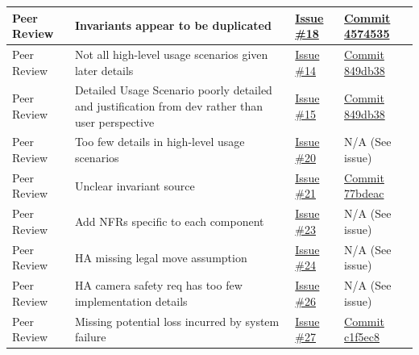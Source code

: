\documentclass{article}
\begin{document}
\begin{landscape}
\begin{tabularx}{\linewidth}{|P{2.3cm}|Y|P{2.5cm}|P{3.5cm}|}
        \hline
        Peer Review &
        Invariants appear to be duplicated &
        \href{https://github.com/AlgoCatan/RLCatan/issues/18}{Issue \#18} &
        \href{https://github.com/AlgoCatan/RLCatan/commit/4574535067f674fb58bea087aebc4723ab7042a7}{Commit 4574535} \\

        \hline
        Peer Review &
        Not all high-level usage scenarios given later details &
        \href{https://github.com/AlgoCatan/RLCatan/issues/14}{Issue \#14} &
        \href{https://github.com/AlgoCatan/RLCatan/commit/849db38b2cf12eb7b75cb533febe9b18bc03d4c8}{Commit 849db38} \\

        \hline
        Peer Review &
        Detailed Usage Scenario poorly detailed and justification from dev rather than user perspective &
        \href{https://github.com/AlgoCatan/RLCatan/issues/15}{Issue \#15} &
        \href{https://github.com/AlgoCatan/RLCatan/commit/849db38b2cf12eb7b75cb533febe9b18bc03d4c8}{Commit 849db38} \\

        \hline
        Peer Review &
        Too few details in high-level usage scenarios &
        \href{https://github.com/AlgoCatan/RLCatan/issues/20}{Issue \#20} &
        N/A (See issue) \\

        \hline
        Peer Review &
        Unclear invariant source &
        \href{https://github.com/AlgoCatan/RLCatan/issues/21}{Issue \#21} &
        \href{https://github.com/AlgoCatan/RLCatan/commit/77bdeaca970d2643ddce250b1b030626451bfc37}{Commit 77bdeac} \\

        \hline
        Peer Review &
        Add NFRs specific to each component &
        \href{https://github.com/AlgoCatan/RLCatan/issues/23}{Issue \#23} &
        N/A (See issue) \\

        \hline
        Peer Review &
        HA missing legal move assumption &
        \href{https://github.com/AlgoCatan/RLCatan/issues/24}{Issue \#24} &
        N/A (See issue) \\

        \hline
        Peer Review &
        HA camera safety req has too few implementation details &
        \href{https://github.com/AlgoCatan/RLCatan/issues/26}{Issue \#26} &
        N/A (See issue) \\

        \hline
        Peer Review &
        Missing potential loss incurred by system failure &
        \href{https://github.com/AlgoCatan/RLCatan/issues/27}{Issue \#27} &
        \href{https://github.com/AlgoCatan/RLCatan/commit/c1f5ec82a0a6f454403809555ce19ad0a5551874}{Commit c1f5ec8} \\


\end{tabularx}
\end{landscape}
\end{document}

